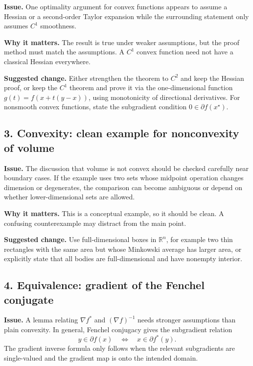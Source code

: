 \documentclass[11pt]{article}
\begin{document}
\textbf{Issue.}  One optimality argument for convex functions appears to assume a Hessian or a second-order Taylor expansion while the surrounding statement only assumes \(C^1\) smoothness.

\textbf{Why it matters.}  The result is true under weaker assumptions, but the proof method must match the assumptions.  A \(C^1\) convex function need not have a classical Hessian everywhere.

\textbf{Suggested change.}  Either strengthen the theorem to \(C^2\) and keep the Hessian proof, or keep the \(C^1\) theorem and prove it via the one-dimensional function \(g(t)=f(x+t(y-x))\), using monotonicity of directional derivatives.  For nonsmooth convex functions, state the subgradient condition \(0\in \partial f(x^\star)\).

\subsection*{3. Convexity: clean example for nonconvexity of volume}

\textbf{Issue.}  The discussion that volume is not convex should be checked carefully near boundary cases.  If the example uses two sets whose midpoint operation changes dimension or degenerates, the comparison can become ambiguous or depend on whether lower-dimensional sets are allowed.

\textbf{Why it matters.}  This is a conceptual example, so it should be clean.  A confusing counterexample may distract from the main point.

\textbf{Suggested change.}  Use full-dimensional boxes in \(\mathbb R^n\), for example two thin rectangles with the same area but whose Minkowski average has larger area, or explicitly state that all bodies are full-dimensional and have nonempty interior.

\subsection*{4. Equivalence: gradient of the Fenchel conjugate}

\textbf{Issue.}  A lemma relating \(\nabla f^\ast\) and \((\nabla f)^{-1}\) needs stronger assumptions than plain convexity.  In general, Fenchel conjugacy gives the subgradient relation
\[
y\in \partial f(x) \quad\Longleftrightarrow\quad x\in \partial f^\ast(y).
\]
The gradient inverse formula only follows when the relevant subgradients are single-valued and the gradient map is onto the intended domain.
\end{document}
